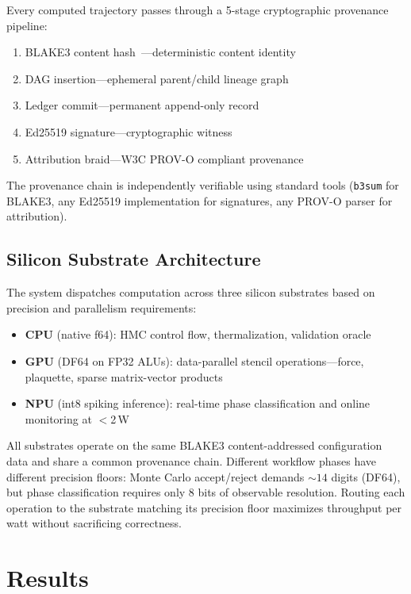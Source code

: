 \documentclass[aps,prl,twocolumn,superscriptaddress,showpacs]{revtex4-2}
\begin{document}
Every computed trajectory passes through a 5-stage cryptographic
provenance pipeline:

\begin{enumerate}
\item BLAKE3 content hash~\cite{blake3}---deterministic content identity
\item DAG insertion---ephemeral parent/child lineage graph
\item Ledger commit---permanent append-only record
\item Ed25519 signature---cryptographic witness
\item Attribution braid---W3C PROV-O compliant provenance
\end{enumerate}

The provenance chain is independently verifiable using standard tools
(\texttt{b3sum} for BLAKE3, any Ed25519 implementation for signatures,
any PROV-O parser for attribution).

\subsection{Silicon Substrate Architecture}

The system dispatches computation across three silicon substrates based on
precision and parallelism requirements:

\begin{itemize}
\item \textbf{CPU} (native f64): HMC control flow, thermalization,
  validation oracle
\item \textbf{GPU} (DF64 on FP32 ALUs): data-parallel stencil operations---force,
  plaquette, sparse matrix-vector products
\item \textbf{NPU} (int8 spiking inference): real-time phase classification
  and online monitoring at $<$2\,W
\end{itemize}

All substrates operate on the same BLAKE3 content-addressed configuration
data and share a common provenance chain. Different workflow phases have
different precision floors: Monte Carlo accept/reject demands ${\sim}14$
digits (DF64), but phase classification requires only 8 bits of observable
resolution. Routing each operation to the substrate matching its precision
floor maximizes throughput per watt without sacrificing correctness.

\section{Results}
\label{sec:results}
\end{document}
